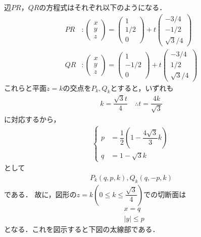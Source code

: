 \documentclass[../../main.tex]{subfiles}
\begin{document}
辺$PR$，$QR$の方程式はそれぞれ以下のようになる．
\begin{align}
  PR&:
  \begin{pmatrix}x\\y\\z
  \end{pmatrix}=
  \begin{pmatrix}1\\1/2\\0
  \end{pmatrix}+t
  \begin{pmatrix}-3/4\\-1/2\\\sqrt{3}/4
  \end{pmatrix} \\
  QR&:
  \begin{pmatrix}x\\y\\z
  \end{pmatrix}=
  \begin{pmatrix}1\\-1/2\\0
  \end{pmatrix}+t
  \begin{pmatrix}-3/4\\1/2\\\sqrt{3}/4
  \end{pmatrix}
\end{align}
これらと平面$z=k$の交点を$P_{k},Q_{k}$とすると，いずれも
\begin{align}
  k = \dfrac{\sqrt{3}t}{4} \quad \therefore t = \dfrac{4k}{\sqrt{3}}
\end{align}
に対応するから，
\begin{align}
  \begin{cases}
    p&=\dfrac{1}{2}\left(1-\dfrac{4\sqrt{3}}{3}k\right)  \\
    q&=1-\sqrt{3}k
  \end{cases}
\end{align}
として
\begin{align}
  P_{k}(q,p,k), Q_{k}(q,-p,k)
\end{align}
である．
故に，図形の$z=k(0\le k\le \dfrac{\sqrt{3}}{4})$での切断面は
\begin{align}
  &x=q \\
  &|y|\le p
\end{align}
となる．これを図示すると下図の太線部である．
\end{document}
